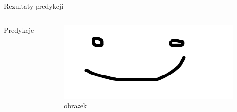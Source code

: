 \begin{frame}{Rezultaty predykcji}
    \begin{columns}[t]
            Predykcje
        \centering
        \begin{figure}
            \centering
            \includegraphics[width=1\textwidth]{images/obrazek.png}
            \caption{obrazek}
            \label{fig:pic}
        \end{figure}    
    \end{columns}
\end{frame}

